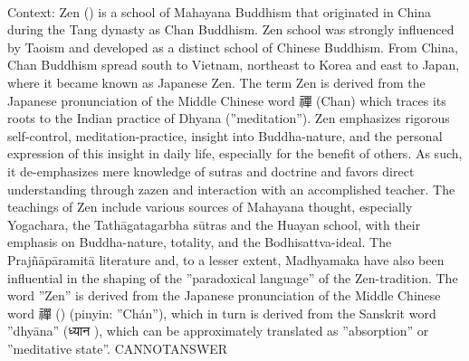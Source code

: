 \documentclass[11pt,a4paper, onecolumn]{article}
\begin{document}
\\ Context: Zen () is a school of Mahayana Buddhism that originated in China during the Tang dynasty as Chan Buddhism. Zen school was strongly influenced by Taoism and developed as a distinct school of Chinese Buddhism. From China, Chan Buddhism spread south to Vietnam, northeast to Korea and east to Japan, where it became known as Japanese Zen. The term Zen is derived from the Japanese pronunciation of the Middle Chinese word 禪 (Chan) which traces its roots to the Indian practice of Dhyana (''meditation''). Zen emphasizes rigorous self-control, meditation-practice, insight into Buddha-nature, and the personal expression of this insight in daily life, especially for the benefit of others. As such, it de-emphasizes mere knowledge of sutras and doctrine and favors direct understanding through zazen and interaction with an accomplished teacher. The teachings of Zen include various sources of Mahayana thought, especially Yogachara, the Tathāgatagarbha sūtras and the Huayan school, with their emphasis on Buddha-nature, totality, and the Bodhisattva-ideal. The Prajñāpāramitā literature and, to a lesser extent, Madhyamaka have also been influential in the shaping of the ''paradoxical language'' of the Zen-tradition. The word ''Zen'' is derived from the Japanese pronunciation of the Middle Chinese word 禪 () (pinyin: ''Chán''), which in turn is derived from the Sanskrit word ''dhyāna'' (ध्यान ), which can be approximately translated as ''absorption'' or ''meditative state''. CANNOTANSWER
\end{document}

